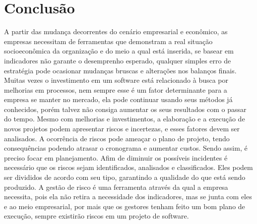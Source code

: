 \documentclass[12pt]{article}
\begin{document}
    \section{Conclusão}
    
        A partir das mudança decorrentes do cenário empresarial e econômico, as empresas necessitam de ferramentas que  demonstram a real situação socioeconômica da organização e do meio a qual está inserida, se basear em indicadores não garante o desemprenho esperado, qualquer simples erro de estratégia pode ocasionar mudanças bruscas e alterações nos balanços finais.
        Muitas vezes o investimento em um software está relacionado à busca por melhorias em processos, nem sempre esse é um fator determinante para a empresa se manter no mercado, ela pode continuar usando seus métodos já conhecidos, porém talvez não consiga aumentar os seus resultados com o passar do tempo.
        Mesmo com melhorias e investimentos, a elaboração e a execução de novos projetos podem apresentar riscos e incertezas, e esses fatores devem ser analisados. A ocorrência de riscos pode ameaçar o plano de projeto, tendo consequências podendo atrasar o cronograma e aumentar custos. Sendo assim, é preciso focar em planejamento.
        Afim de diminuir os possíveis incidentes é necessário que os riscos sejam identificados, analisados e classificados. Eles podem ser divididos de acordo com seu tipo, garantindo a qualidade do que está sendo produzido.
        A gestão de risco é uma ferramenta através da qual a empresa necessita, pois ela não retira a necessidade dos indicadores, mas se junta com eles e ao meio empresarial, por mais que os gestores tenham feito um bom plano de execução, sempre existirão riscos em um projeto de software.
        
    \nocite{*}
    
    
\end{document}
